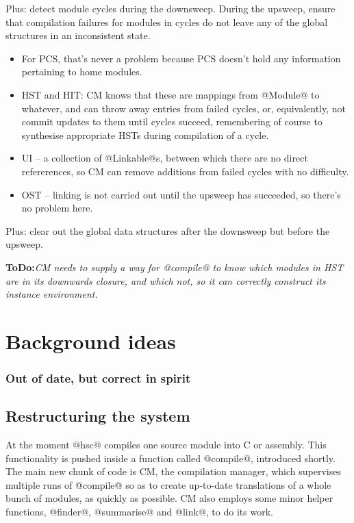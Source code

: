 \documentclass[11pt]{article}
\newcommand{\ToDo}[1]{{{\bf ToDo:}\sl #1}}
\begin{document}
Plus: detect module cycles during the downsweep.  During the upsweep,
ensure that compilation failures for modules in cycles do not leave
any of the global structures in an inconsistent state.  
\begin{itemize}
\item 
   For PCS, that's never a problem because PCS doesn't hold any
   information pertaining to home modules.
\item 
   HST and HIT: CM knows that these are mappings from @Module@ to
   whatever, and can throw away entries from failed cycles, or,
   equivalently, not commit updates to them until cycles succeed,
   remembering of course to synthesise appropriate HSTs during
   compilation of a cycle.
\item 
   UI -- a collection of @Linkable@s, between which there are no
   direct refererences, so CM can remove additions from failed cycles
   with no difficulty.
\item 
   OST -- linking is not carried out until the upsweep has
   succeeded, so there's no problem here.
\end{itemize}

Plus: clear out the global data structures after the downsweep but
before the upsweep.

\ToDo{CM needs to supply a way for @compile@ to know which modules in
      HST are in its downwards closure, and which not, so it can
      correctly construct its instance environment.}



\section{Background ideas}
\subsubsection*{Out of date, but correct in spirit}

\subsection{Restructuring the system}

At the moment @hsc@ compiles one source module into C or assembly.
This functionality is pushed inside a function called @compile@,
introduced shortly.  The main new chunk of code is CM, the compilation manager,
which supervises multiple runs of @compile@ so as to create up-to-date
translations of a whole bunch of modules, as quickly as possible.
CM also employs some minor helper functions, @finder@, @summarise@ and
@link@, to do its work.
\end{document}
